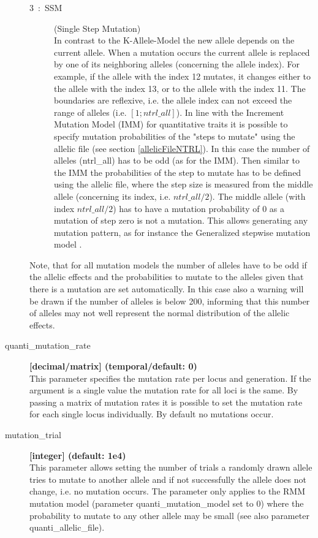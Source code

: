\documentclass[letterpaper,12pt,oneside]{book}
\begin{document}
\begin{description}
\begin{description}
\item[3~:~SSM] (Single Step Mutation)\\
In contrast to the K-Allele-Model the new allele depends on the current allele. When a mutation occurs the current allele is replaced by one of its neighboring alleles (concerning the allele index). For example, if the allele with the index 12 mutates, it changes either to the allele with the index 13, or to the allele with the index 11. The boundaries are reflexive, i.e. the allele index can not exceed the range of alleles (i.e. $[1; ntrl\_all]$). In line with the Increment Mutation Model (IMM) for quantitative traits it is possible to specify mutation probabilities of the "steps to mutate" using the allelic file (see section \ref{allelicFileNTRL}). In this case the number of alleles (\textsf{ntrl\_all}) has to be odd (as for the IMM). Then similar to the IMM the probabilities of the step to mutate has to be defined using the allelic file, where the step size is measured from the middle allele (concerning its index, i.e. $ntrl\_all/2$). The middle allele (with index $ntrl\_all/2$) has to have a mutation probability of 0 as a mutation of step zero is not a mutation. This allows generating any mutation pattern, as for instance the Generalized stepwise mutation model \citep{Estoup_2002}.
\end{description}

Note, that for all mutation models the number of alleles have to be odd if the allelic effects and the probabilities to mutate to the alleles given that there is a mutation are set automatically. In this case also a warning will be drawn if the number of alleles is below 200, informing that this number of alleles may not well represent the normal distribution of the allelic effects.

\item[quanti\_mutation\_rate\index{quanti\_mutation\_rate}] \textbf{[decimal/matrix] (temporal/default: 0)}\\
This parameter specifies the mutation rate per locus and generation. If the argument is a single value the mutation rate for all loci is the same. By passing a matrix of mutation rates it is possible to set the mutation rate for each single locus individually. By default no mutations occur.

\item[mutation\_trial\index{mutation\_trial}] \textbf{[integer] (default: 1e4)}\\
This parameter allows setting the number of trials a randomly drawn allele tries to mutate to another allele and if not successfully the allele does not change, i.e. no mutation occurs. The parameter only applies to the RMM mutation model (parameter \textsf{quanti\_mutation\_model} set to 0) where the probability to mutate to any other allele may be small (see also parameter \textsf{quanti\_allelic\_file}).

\end{description}
\end{document}
